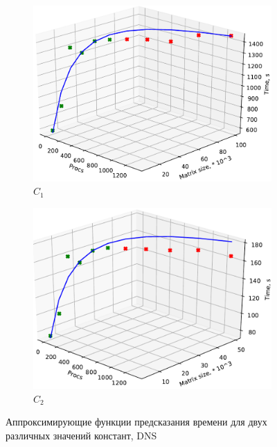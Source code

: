 			\begin{figure}
			\begin{subfigure}{.5\textwidth}
				\includegraphics[width=\linewidth]{./images/dns_k1}
				\caption{\(C_1\)}
				\label{graph_C_1_DNS}
			\end{subfigure}
			\begin{subfigure}{.5\textwidth}
				\includegraphics[width=\linewidth]{./images/dns_k2}
				\caption{\(C_2\)}
				\label{graph_C_2_DNS}
			\end{subfigure}
			\caption{Аппроксимирующие функции предсказания времени для двух различных значений констант, DNS}
			\label{graph_DNS}
			\end{figure}

